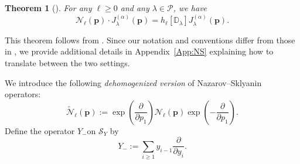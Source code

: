 \documentclass[12pt]{amsart}
\newtheorem{thm}{Theorem}[section]
\theoremstyle{remark}
\newcommand{\bfp}{\boldsymbol{p}}
\newcommand{\J}{{J}^{(\alpha)}}
\newcommand{\bD}{\mathbb D}
\newcommand{\YY}{\mathcal{P}}
\newcommand{\mcS}{\mathcal{S}}
\newcommand{\N}{\mathcal{N}}
\newcommand{\tN}{{\mathcal{\widetilde N}}}
\begin{document}
\begin{thm}[\cite{NazarovSklyanin2013}]\label{thm:NS}
    For any $\ell\geq 0$ and any $\lambda\in\YY$, we have
    $$\N_\ell(\bfp)\cdot \J_\lambda(\bfp)=h_{\ell}[\bD_\lambda]\J_\lambda(\bfp).$$
\end{thm}
This theorem follows from \cite[Theorem~2]{NazarovSklyanin2013}. Since our notation and conventions differ from those in \cite{NazarovSklyanin2013}, we provide additional details in Appendix~\ref{App:NS} explaining how to translate between the two settings.




We introduce the following \textit{dehomogenized version} of Nazarov--Sklyanin operators:
\begin{equation}\label{eq:def_deh_NS}
    \tN_\ell(\bfp):=\exp\left(\frac{\partial}{\partial p_1}\right) \N_\ell(\bfp) \exp\left(-\frac{\partial}{\partial p_1}\right).
\end{equation}
Define the operator  $Y_-$on $\mcS_Y$ by
$$Y_{-}:=\sum_{i\geq 1}y_{i-1}\frac{\partial}{\partial y_{i}}.$$
\end{document}
